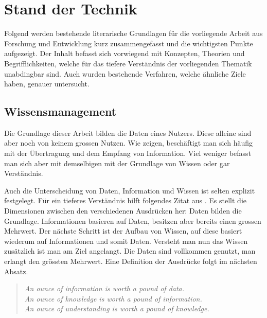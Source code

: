 \chapter{Stand der Technik} \label{literatur}

Folgend werden bestehende literarische Grundlagen für die vorliegende Arbeit aus Forschung und Entwicklung kurz zusammengefasst und die wichtigsten Punkte aufgezeigt. Der Inhalt befasst sich vorwiegend mit Konzepten, Theorien und Begrifflichkeiten, welche für das tiefere Verständnis der vorliegenden Thematik unabdingbar sind. Auch wurden bestehende Verfahren, welche ähnliche Ziele haben, genauer untersucht.




\section{Wissensmanagement}
Die Grundlage dieser Arbeit bilden die Daten eines Nutzers. Diese alleine sind aber noch von keinem grossen Nutzen. Wie \cite{bellinger2004data}
 zeigen, beschäftigt man sich häufig mit der Übertragung und dem Empfang von Information. Viel weniger befasst man sich aber mit demselbigen mit der Grundlage von Wissen oder gar Verständnis. 
 
 Auch die Unterscheidung von Daten, Information und Wissen ist selten explizit festgelegt. Für ein tieferes Verständnis hilft folgendes Zitat  aus \cite{ackoff1989data}. Es stellt die Dimensionen zwischen den verschiedenen Ausdrücken her: Daten bilden die Grundlage. Informationen basieren auf Daten, besitzen aber bereits einen grossen Mehrwert. Der nächste Schritt ist der Aufbau von Wissen, auf diese basiert wiederum auf Informationen und somit Daten. Versteht man nun das Wissen zusätzlich ist man am Ziel angelangt. Die Daten sind vollkommen genutzt, man erlangt den grössten Mehrwert. Eine Definition der Ausdrücke folgt im nächsten Absatz.

\begin{quote}\label{wissen-zitat}
\textit{An ounce of information is worth a pound of data.}\\
\textit{An ounce of knowledge is worth a pound of information.}\\
\textit{An ounce of understanding is worth a pound of knowledge.}\\
\end{quote}

